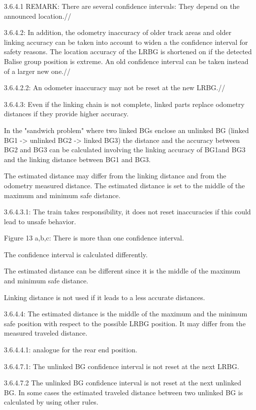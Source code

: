 3.6.4.1 REMARK: There are several confidence intervals: They depend on the announced location.//

3.6.4.2: In addition, the odometry inaccuracy of older track areas and older linking accuracy can be taken into account to widen a the confidence interval for safety reasons. The location accuracy of the LRBG is shortened on if the detected Balise group position is extreme. An old confidence interval can be taken instead of a larger new one.//

3.6.4.2.2: An odometer inaccuracy may not be reset at the new LRBG.//

3.6.4.3: Even if the linking chain is not complete, linked parts replace odometry distances if they provide higher accuracy.

In the "sandwich problem" where two linked BGs enclose an unlinked BG 
(linked BG1 -> unlinked BG2 -> linked BG3) 
the distance and the accuracy between BG2 and BG3 can be calculated involving the linking accuracy of BG1and BG3 and the linking distance between BG1 and BG3. 

The estimated distance may differ from the linking distance and from the odometry measured distance. The estimated distance is set to the middle of the maximum and minimum safe distance.

3.6.4.3.1:
The train takes responsibility, it does not reset inaccuracies if this could lead to unsafe behavior. 

Figure 13 a,b,c:
There is more than one confidence interval.

The confidence interval is calculated differently.

The estimated distance can be different since it is the middle of the maximum and minimum safe distance.

Linking distance is not used if it leads to a less accurate distances.

3.6.4.4:
The estimated distance is the middle of the maximum and the minimum safe position with respect to the possible LRBG position. It may differ from the measured traveled distance.

3.6.4.4.1:
analogue for the rear end position.

3.6.4.7.1:
The unlinked BG confidence interval is not reset at the next LRBG.

3.6.4.7.2
The unlinked BG confidence interval is not reset at the next unlinked BG. In some cases the estimated traveled distance between two unlinked BG is calculated by using other rules.
